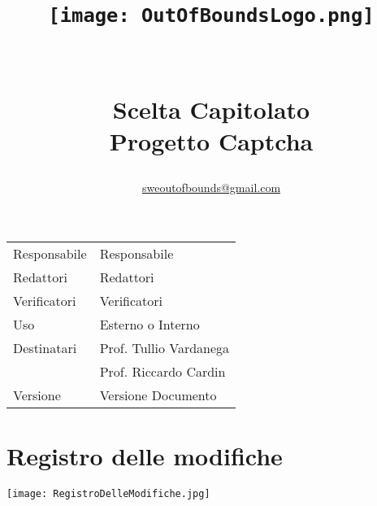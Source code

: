 \documentclass[a4paper, 10pt]{article}
\date{}
\title{
\texttt{[image: OutOfBoundsLogo.png]}\\ 
\hfill \\ 
\hfill \\ 
\Large Scelta Capitolato \\ 
\Huge Progetto Captcha\\
\Large \author{\href{mailto:sweoutofbounds@gmail.com}{sweoutofbounds@gmail.com}}
}
\begin{document}
    \maketitle
    \begin{Large}
    \begin{tabular}{ R{5cm} | p{5cm} } 
        Responsabile & Responsabile\\ 
        Redattori & Redattori\\ 
        Verificatori & Verificatori\\
        Uso & Esterno o Interno\\
        Destinatari & Prof. Tullio Vardanega\\
        \hfill & Prof. Riccardo Cardin\\
        Versione & Versione Documento
    \end{tabular}
    \end{Large}
    \newpage
    \tableofcontents
    \newpage
    \section{Registro delle modifiche}
    \begin{center}
        \texttt{[image: RegistroDelleModifiche.jpg]} 
    \end{center}
\end{document}
